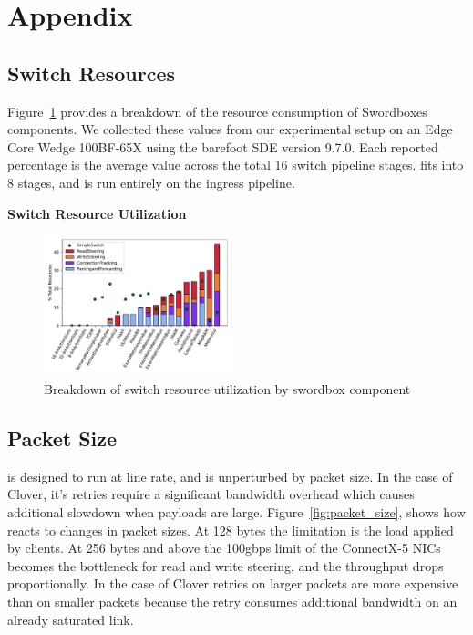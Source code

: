 \section{Appendix}

\subsection{Switch Resources}
\label{sec:appendix_resources}

Figure~\ref{fig:switch_resources} provides a breakdown of the resource
consumption of Swordboxes components. We collected these values from our
experimental setup on an Edge Core Wedge 100BF-65X using the barefoot SDE
version 9.7.0. Each reported percentage is the average value across the total 16
switch pipeline stages. {\sword} fits into 8 stages, and is run entirely on the
ingress pipeline.

\textbf{Switch Resource Utilization}
\begin{figure}[t]
    \includegraphics[width=0.485\textwidth]{fig/switch_resources.pdf}
    \caption{Breakdown of switch resource utilization by swordbox component}
    \label{fig:switch_resources}
\end{figure}

\subsection{Packet Size}

{\sword} is designed to run at line rate, and is unperturbed by packet size. In
the case of Clover, it's retries require a significant bandwidth overhead which
causes additional slowdown when payloads are large.
Figure~\ref{fig:packet_size}, shows how {\sword} reacts to changes in packet
sizes. At 128 bytes the limitation is the load applied by clients. At 256 bytes
and above the 100gbps limit of the ConnectX-5 NICs becomes the bottleneck for
read and write steering, and the throughput drops proportionally. In the case of
Clover retries on larger packets are more expensive than on smaller packets
because the retry consumes additional bandwidth on an already saturated link.

